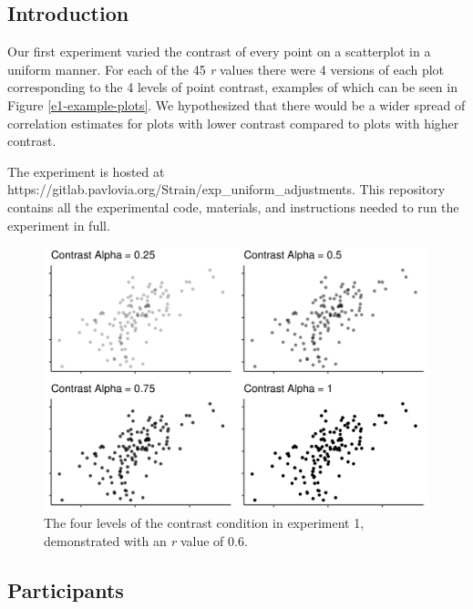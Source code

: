 \documentclass[preprint, 3p,
authoryear]{elsarticle} %
\begin{document}
\hypertarget{introduction-1}{%
\subsection{Introduction}\label{introduction-1}}

Our first experiment varied the contrast of every point on a scatterplot
in a uniform manner. For each of the 45 \emph{r} values there were 4
versions of each plot corresponding to the 4 levels of point contrast,
examples of which can be seen in Figure \ref{e1-example-plots}. We
hypothesized that there would be a wider spread of correlation estimates
for plots with lower contrast compared to plots with higher contrast.

The experiment is hosted at
https://gitlab.pavlovia.org/Strain/exp\_uniform\_adjustments. This
repository contains all the experimental code, materials, and
instructions needed to run the experiment in full.

\begin{figure}

\includegraphics[width=1\linewidth]{plot_examples/uniform_adjustments_plot_examples} \hfill{}

\caption{\label{e1-example-plots}The four levels of the contrast condition in experiment 1, demonstrated with an \textit{r} value of 0.6.}\label{fig:e1-example-plots}
\end{figure}

\hypertarget{participants}{%
\subsection{Participants}\label{participants}}
\end{document}
